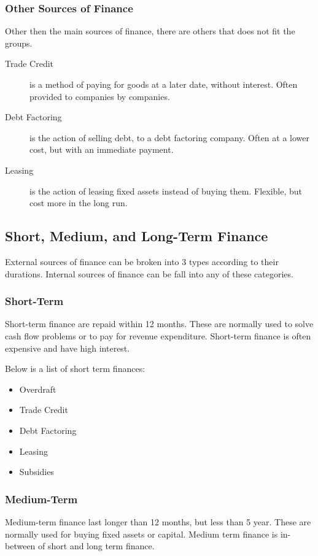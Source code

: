 \documentclass{standalone}
\begin{document}
\subsubsection{Other Sources of Finance}
Other then the main sources of finance, there are others that does not fit the groups.

\begin{description}
    \item[Trade Credit] is a method of paying for goods at a later date, without interest. Often provided to companies by companies.
    \item[Debt Factoring] is the action of selling debt, to a debt factoring company. Often at a lower cost, but with an immediate payment.
    \item[Leasing] is the action of leasing fixed assets instead of buying them. Flexible, but cost more in the long run.
\end{description}

\subsection{Short, Medium, and Long-Term Finance}
External sources of finance can be broken into 3 types according to their durations.
Internal sources of finance can be fall into any of these categories.

\subsubsection{Short-Term}
Short-term finance are repaid within 12 months. 
These are normally used to solve cash flow problems or to pay for revenue expenditure.
Short-term finance is often expensive and have high interest.

Below is a list of short term finances:
\begin{itemize}
    \item Overdraft
    \item Trade Credit
    \item Debt Factoring
    \item Leasing
    \item Subsidies
\end{itemize}

\subsubsection{Medium-Term}
Medium-term finance last longer than 12 months, but less than 5 year.
These are normally used for buying fixed assets or capital.
Medium term finance is in-between of short and long term finance.
\end{document}
